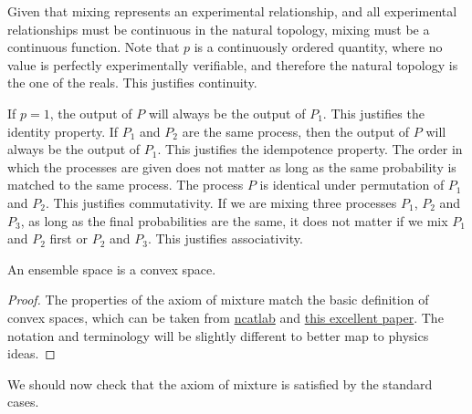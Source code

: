 \begin{mathSection}
\begin{justification}
	Given that mixing represents an experimental relationship, and all experimental relationships must be continuous in the natural topology, mixing must be a continuous function. Note that $p$ is a continuously ordered quantity, where no value is perfectly experimentally verifiable, and therefore the natural topology is the one of the reals. This justifies continuity.

	If $p=1$, the output of $P$ will always be the output of $P_1$. This justifies the identity property. If $P_1$ and $P_2$ are the same process, then the output of $P$ will always be the output of $P_1$. This justifies the idempotence property. The order in which the processes are given does not matter as long as the same probability is matched to the same process. The process $P$ is identical under permutation of $P_1$ and $P_2$. This justifies commutativity. If we are mixing three processes $P_1$, $P_2$ and $P_3$, as long as the final probabilities are the same, it does not matter if we mix $P_1$ and $P_2$ first or $P_2$ and $P_3$. This justifies associativity.
\end{justification}

\begin{coro}
	An ensemble space is a convex space.
\end{coro}

\begin{proof}
	The properties of the axiom of mixture match the basic definition of convex spaces, which can be taken from \href{https://ncatlab.org/nlab/show/convex+space}{ncatlab} and \href{https://arxiv.org/abs/0903.5522}{this excellent paper}.  The notation and terminology will be slightly different to better map to physics ideas. 
\end{proof}

\end{mathSection}

We should now check that the axiom of mixture is satisfied by the standard cases.

